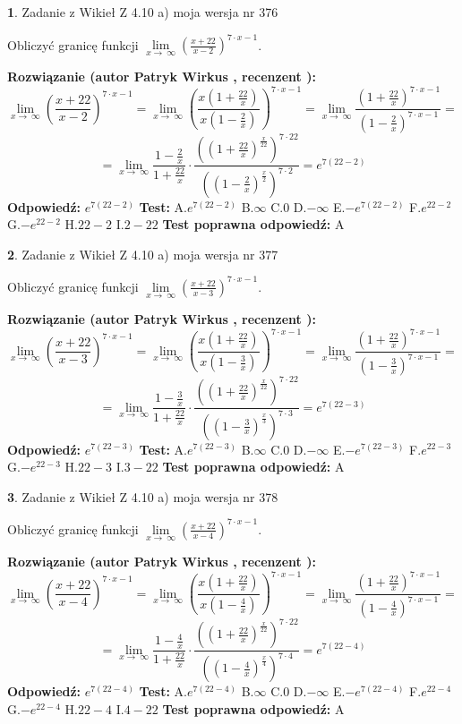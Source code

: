 \documentclass[12pt, a4paper]{article}
\theoremstyle{definition} %
\newtheorem{zad}{}
\newcommand{\zadStart}[1]{\begin{zad}#1\newline}
\newcommand{\zadStop}{\end{zad}}
\newcommand{\rozwStart}[2]{\noindent \textbf{Rozwiązanie (autor #1 , recenzent #2): }\newline}
\newcommand{\rozwStop}{\newline}
\newcommand{\odpStart}{\noindent \textbf{Odpowiedź:}\newline}
\newcommand{\odpStop}{\newline}
\newcommand{\testStart}{\noindent \textbf{Test:}\newline}
\newcommand{\testStop}{\newline}
\newcommand{\kluczStart}{\noindent \textbf{Test poprawna odpowiedź:}\newline}
\newcommand{\kluczStop}{\newline}
\begin{document}
\zadStart{Zadanie z Wikieł Z 4.10 a) moja wersja nr 376}


Obliczyć granicę funkcji  $\lim\limits_{x\to\ \infty}(\frac{x+22}{x-2})^{7\cdot x-1}$.
\zadStop
\rozwStart{Patryk Wirkus}{}
$$\lim\limits_{x\to\ \infty}(\frac{x+22}{x-2})^{7\cdot x-1} = \lim\limits_{x\to\ \infty}(\frac{x(1+\frac{22}{x})}{x(1-\frac{2}{x})})^{7\cdot x-1}=\lim\limits_{x\to\ \infty}\frac{(1+\frac{22}{x})^{7\cdot x-1}}{(1-\frac{2}{x})^{7\cdot x-1}}=$$
$$=\lim\limits_{x\to\ \infty}\frac{1-\frac{2}{x}}{1+\frac{22}{x}}\cdot\frac{((1+\frac{22}{x})^{\frac{x}{22}})^{7\cdot22}}{((1-\frac{2}{x})^{\frac{x}{2}})^{7\cdot2}}=e^{7(22-2)}$$
\rozwStop
\odpStart
$e^{7(22-2)}$
\odpStop
\testStart
A.$e^{7(22-2)}$ B.$\infty$ C.$0$ D.$-\infty$ E.$-e^{7(22-2)}$
F.$e^{22-2}$ G.$-e^{22-2}$
H.$22-2$
I.$2-22$
\testStop
\kluczStart
A
\kluczStop



\zadStart{Zadanie z Wikieł Z 4.10 a) moja wersja nr 377}


Obliczyć granicę funkcji  $\lim\limits_{x\to\ \infty}(\frac{x+22}{x-3})^{7\cdot x-1}$.
\zadStop
\rozwStart{Patryk Wirkus}{}
$$\lim\limits_{x\to\ \infty}(\frac{x+22}{x-3})^{7\cdot x-1} = \lim\limits_{x\to\ \infty}(\frac{x(1+\frac{22}{x})}{x(1-\frac{3}{x})})^{7\cdot x-1}=\lim\limits_{x\to\ \infty}\frac{(1+\frac{22}{x})^{7\cdot x-1}}{(1-\frac{3}{x})^{7\cdot x-1}}=$$
$$=\lim\limits_{x\to\ \infty}\frac{1-\frac{3}{x}}{1+\frac{22}{x}}\cdot\frac{((1+\frac{22}{x})^{\frac{x}{22}})^{7\cdot22}}{((1-\frac{3}{x})^{\frac{x}{3}})^{7\cdot3}}=e^{7(22-3)}$$
\rozwStop
\odpStart
$e^{7(22-3)}$
\odpStop
\testStart
A.$e^{7(22-3)}$ B.$\infty$ C.$0$ D.$-\infty$ E.$-e^{7(22-3)}$
F.$e^{22-3}$ G.$-e^{22-3}$
H.$22-3$
I.$3-22$
\testStop
\kluczStart
A
\kluczStop



\zadStart{Zadanie z Wikieł Z 4.10 a) moja wersja nr 378}


Obliczyć granicę funkcji  $\lim\limits_{x\to\ \infty}(\frac{x+22}{x-4})^{7\cdot x-1}$.
\zadStop
\rozwStart{Patryk Wirkus}{}
$$\lim\limits_{x\to\ \infty}(\frac{x+22}{x-4})^{7\cdot x-1} = \lim\limits_{x\to\ \infty}(\frac{x(1+\frac{22}{x})}{x(1-\frac{4}{x})})^{7\cdot x-1}=\lim\limits_{x\to\ \infty}\frac{(1+\frac{22}{x})^{7\cdot x-1}}{(1-\frac{4}{x})^{7\cdot x-1}}=$$
$$=\lim\limits_{x\to\ \infty}\frac{1-\frac{4}{x}}{1+\frac{22}{x}}\cdot\frac{((1+\frac{22}{x})^{\frac{x}{22}})^{7\cdot22}}{((1-\frac{4}{x})^{\frac{x}{4}})^{7\cdot4}}=e^{7(22-4)}$$
\rozwStop
\odpStart
$e^{7(22-4)}$
\odpStop
\testStart
A.$e^{7(22-4)}$ B.$\infty$ C.$0$ D.$-\infty$ E.$-e^{7(22-4)}$
F.$e^{22-4}$ G.$-e^{22-4}$
H.$22-4$
I.$4-22$
\testStop
\kluczStart
A
\kluczStop
\end{document}
